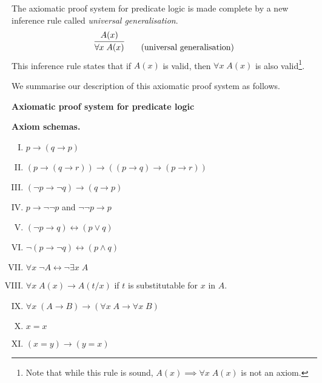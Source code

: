 The axiomatic proof system for predicate logic is made complete by a new inference rule called \emph{universal generalisation}.
%
\[
    \infer{\forall x\; A(x)}{A(x)}
    \tag{universal generalisation}
\]
%
This inference rule states that if \(A(x)\) is valid, then \(\forall x\; A(x)\) is also valid\footnote{Note that while this rule is sound, \(A(x) \implies \forall x\; A(x)\) is not an axiom.}.

We summarise our description of this axiomatic proof system as follows.

\vspace{1em}
\begin{mdframed}[linewidth=1pt]
\begin{center}
    \large\textbf{Axiomatic proof system for predicate logic}
\end{center}

\textbf{Axiom schemas.}
%
\begin{enumerate}[I.]
    \item \(p \rightarrow (q \rightarrow p)\)
    
    \item \((p \rightarrow (q \rightarrow r)) \rightarrow ((p \rightarrow q) \rightarrow (p \rightarrow r))\)
    
    \item \((\neg p \rightarrow \neg q) \rightarrow (q \rightarrow p)\)

    \item \(p \rightarrow \neg\neg p\) and \(\neg\neg p \rightarrow p\)
    
    \item \((\neg p \rightarrow q) \leftrightarrow (p \lor q)\)
    
    \item \(\neg(p \rightarrow \neg q) \leftrightarrow (p \land q)\)
    
    \item \(\forall x\; \neg A \leftrightarrow \neg\exists x\; A\)
    
    \item \(\forall x\; A(x) \rightarrow A(t/x)\) \;\; if \(t\) is substitutable for \(x\) in \(A\).
    
    \item \(\forall x\; (A \rightarrow B) \rightarrow (\forall x\; A \rightarrow \forall x\; B)\)

    \item \(x = x\)
    
    \item \((x = y) \rightarrow (y = x)\)
    

\end{enumerate}
\end{mdframed}
